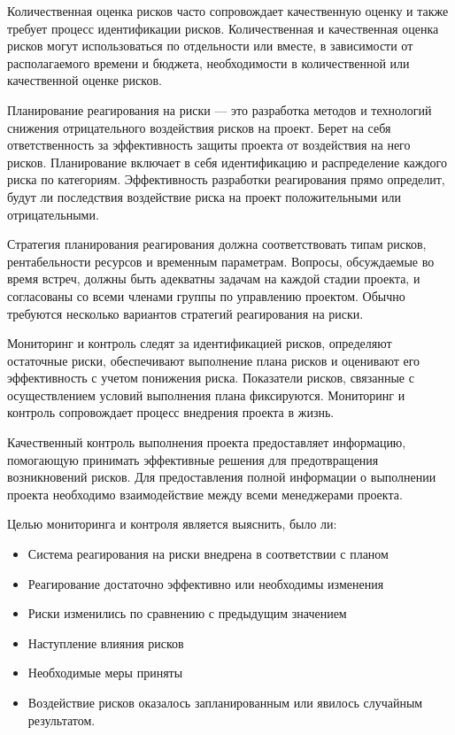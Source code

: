 Количественная оценка рисков часто сопровождает качественную оценку и также требует процесс идентификации рисков. Количественная и качественная оценка рисков могут использоваться по отдельности или вместе, в зависимости от располагаемого времени и бюджета, необходимости в количественной или качественной оценке рисков.

Планирование реагирования на риски --- это разработка методов и технологий снижения отрицательного воздействия рисков на проект. Берет на себя ответственность за эффективность защиты проекта от воздействия на него рисков. Планирование включает в себя идентификацию и распределение каждого риска по категориям. Эффективность разработки реагирования прямо определит, будут ли последствия воздействие риска на проект положительными или отрицательными. 

Стратегия планирования реагирования должна соответствовать типам рисков, рентабельности ресурсов и временным параметрам. Вопросы, обсуждаемые во время встреч, должны быть адекватны задачам на каждой стадии проекта, и согласованы со всеми членами группы по управлению проектом. Обычно требуются несколько вариантов стратегий реагирования на риски.

Мониторинг и контроль следят за идентификацией рисков, определяют остаточные риски, обеспечивают выполнение плана рисков и оценивают его эффективность с учетом понижения риска. Показатели рисков, связанные с осуществлением условий выполнения плана фиксируются. Мониторинг и контроль сопровождает процесс внедрения проекта в жизнь.

Качественный контроль выполнения проекта предоставляет информацию, помогающую принимать эффективные решения для предотвращения возникновений рисков. Для предоставления полной информации о выполнении проекта необходимо взаимодействие между всеми менеджерами проекта.

Целью мониторинга и контроля является выяснить, было ли:
\begin{itemize}
\item Система реагирования на риски внедрена в соответствии с планом
\item Реагирование достаточно эффективно или необходимы изменения
\item Риски изменились по сравнению с предыдущим значением
\item Наступление влияния рисков
\item Необходимые меры приняты
\item Воздействие рисков оказалось запланированным или явилось случайным результатом.
\end{itemize}

